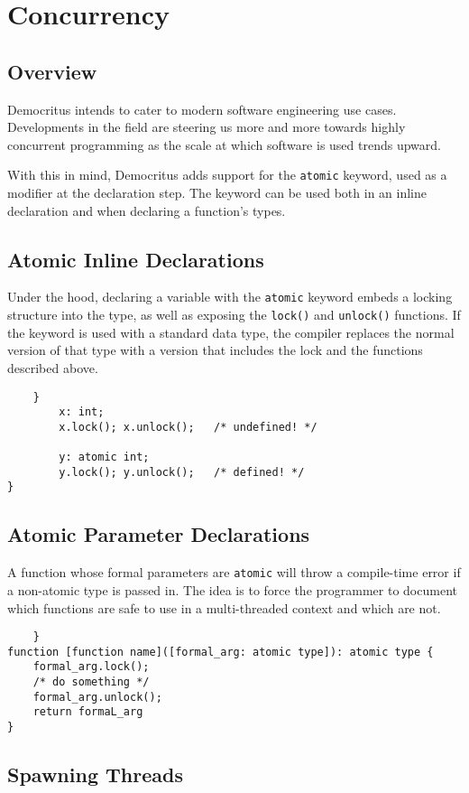 \chapter{Concurrency}
	\section{Overview}
		Democritus intends to cater to modern software engineering use cases. Developments in the field are steering us more and more towards highly concurrent programming as the scale at which software is used trends upward.

		\vspace{5mm}
		\noindent
		With this in mind, Democritus adds support for the \texttt{atomic} keyword, used as a modifier at the declaration step. The keyword can be used both in an inline declaration and when declaring a function's types.

	\section{Atomic Inline Declarations}
		Under the hood, declaring a variable with the \texttt{atomic} keyword embeds a locking structure into the type, as well as exposing the \texttt{lock()} and \texttt{unlock()} functions. If the keyword is used with a standard data type, the compiler replaces the normal version of that type with a version that includes the lock and the functions described above.

		\begin{lstlisting}
	}
		x: int;
		x.lock(); x.unlock();	/* undefined! */

		y: atomic int;
		y.lock(); y.unlock();	/* defined! */
}
		\end{lstlisting}

	\section{Atomic Parameter Declarations}
		A function whose formal parameters are \texttt{atomic} will throw a compile-time error if a non-atomic type is passed in. The idea is to force the programmer to document which functions are safe to use in a multi-threaded context and which are not.

		\begin{lstlisting}
	}
function [function name]([formal_arg: atomic type]): atomic type {
	formal_arg.lock();
	/* do something */
	formal_arg.unlock();
	return formaL_arg
}
		\end{lstlisting}

	\section{Spawning Threads}